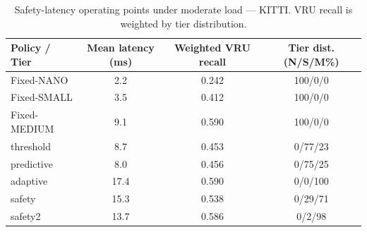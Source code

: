 \begin{table}[t]
\centering
\caption{Safety-latency operating points under moderate load — KITTI. VRU recall is weighted by tier distribution.}
\label{tab:pareto_kitti}
\begin{tabular}{lccc}
\toprule
Policy / Tier & Mean latency (ms) & Weighted VRU recall & Tier dist. (N/S/M\%) \\
\midrule
Fixed-NANO & 2.2 & 0.242 & 100/0/0 \\
Fixed-SMALL & 3.5 & 0.412 & 100/0/0 \\
Fixed-MEDIUM & 9.1 & 0.590 & 100/0/0 \\
\midrule
threshold & 8.7 & 0.453 & 0/77/23 \\
predictive & 8.0 & 0.456 & 0/75/25 \\
adaptive & 17.4 & 0.590 & 0/0/100 \\
safety & 15.3 & 0.538 & 0/29/71 \\
safety2 & 13.7 & 0.586 & 0/2/98 \\
\bottomrule
\end{tabular}
\end{table}
